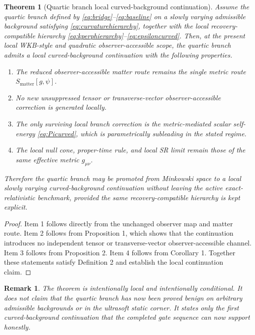 \documentclass[11pt]{article}
\newtheorem{remark}{Remark}
\newtheorem{theorem}{Theorem}
\begin{document}
\begin{theorem}[Quartic branch local curved-background continuation]
Assume the quartic branch defined by \eqref{eq:bridge}--\eqref{eq:baseline} on a slowly varying admissible background satisfying \eqref{eq:curvaturehierarchy}, together with the local recovery-compatible hierarchy \eqref{eq:kperphierarchy}--\eqref{eq:epsiloncurved}. Then, at the present local WKB-style and quadratic observer-accessible scope, the quartic branch admits a local curved-background continuation with the following properties.
\begin{enumerate}
    \item The reduced observer-accessible matter route remains the single metric route \(S_{\mathrm{matter}}[g,\psi]\).
    \item No new unsuppressed tensor or transverse-vector observer-accessible correction is generated locally.
    \item The only surviving local branch correction is the metric-mediated scalar self-energy \eqref{eq:Picurved}, which is parametrically subleading in the stated regime.
    \item The local null cone, proper-time rule, and local SR limit remain those of the same effective metric \(g_{\mu\nu}\).
\end{enumerate}
Therefore the quartic branch may be promoted from Minkowski space to a local slowly varying curved-background continuation without leaving the active exact-relativistic benchmark, provided the same recovery-compatible hierarchy is kept explicit.
\end{theorem}

\begin{proof}
Item 1 follows directly from the unchanged observer map and matter route. Item 2 follows from Proposition 1, which shows that the continuation introduces no independent tensor or transverse-vector observer-accessible channel. Item 3 follows from Proposition 2. Item 4 follows from Corollary 1. Together these statements satisfy Definition 2 and establish the local continuation claim.
\end{proof}

\begin{remark}
The theorem is intentionally local and intentionally conditional. It does not claim that the quartic branch has now been proved benign on arbitrary admissible backgrounds or in the ultrasoft static corner. It states only the first curved-background continuation that the completed gate sequence can now support honestly.
\end{remark}
\end{document}
